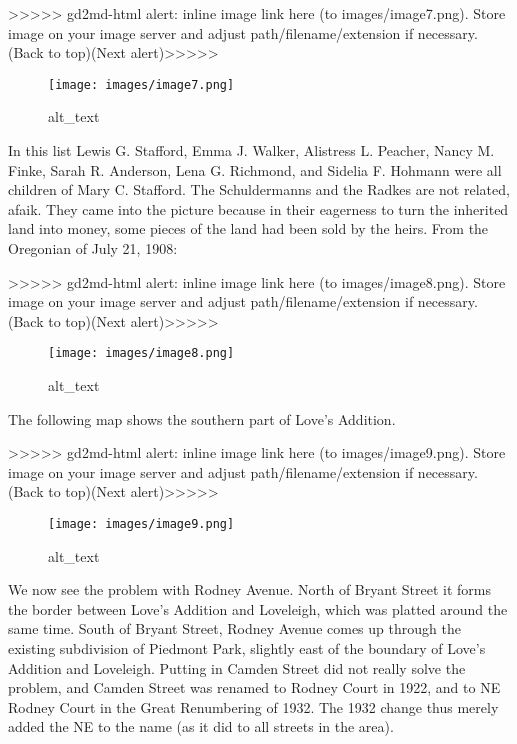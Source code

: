 \documentclass[
]{article}
\begin{document}
{\textgreater\textgreater\textgreater\textgreater\textgreater{}
gd2md-html alert: inline image link here (to images/image7.png). Store
image on your image server and adjust path/filename/extension if
necessary. }(Back to top)(Next
alert){\textgreater\textgreater\textgreater\textgreater\textgreater{} }

\begin{figure}
\centering
\texttt{[image: images/image7.png]}
\caption{alt\_text}
\end{figure}

In this list Lewis G. Stafford, Emma J. Walker, Alistress L. Peacher,
Nancy M. Finke, Sarah R. Anderson, Lena G. Richmond, and Sidelia F.
Hohmann were all children of Mary C. Stafford. The Schuldermanns and the
Radkes are not related, afaik. They came into the picture because in
their eagerness to turn the inherited land into money, some pieces of
the land had been sold by the heirs. From the Oregonian of July 21,
1908:

{\textgreater\textgreater\textgreater\textgreater\textgreater{}
gd2md-html alert: inline image link here (to images/image8.png). Store
image on your image server and adjust path/filename/extension if
necessary. }(Back to top)(Next
alert){\textgreater\textgreater\textgreater\textgreater\textgreater{} }

\begin{figure}
\centering
\texttt{[image: images/image8.png]}
\caption{alt\_text}
\end{figure}

The following map shows the southern part of Love's Addition.

{\textgreater\textgreater\textgreater\textgreater\textgreater{}
gd2md-html alert: inline image link here (to images/image9.png). Store
image on your image server and adjust path/filename/extension if
necessary. }(Back to top)(Next
alert){\textgreater\textgreater\textgreater\textgreater\textgreater{} }

\begin{figure}
\centering
\texttt{[image: images/image9.png]}
\caption{alt\_text}
\end{figure}

We now see the problem with Rodney Avenue. North of Bryant Street it
forms the border between Love's Addition and Loveleigh, which was
platted around the same time. South of Bryant Street, Rodney Avenue
comes up through the existing subdivision of Piedmont Park, slightly
east of the boundary of Love's Addition and Loveleigh. Putting in Camden
Street did not really solve the problem, and Camden Street was renamed
to Rodney Court in 1922, and to NE Rodney Court in the Great Renumbering
of 1932. The 1932 change thus merely added the NE to the name (as it did
to all streets in the area).
\end{document}
